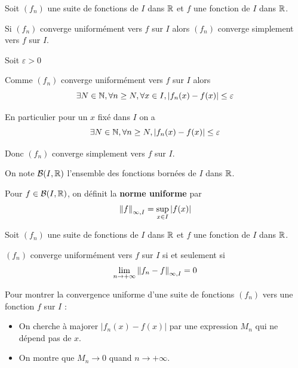 \documentclass[a4paper, 12pt]{article}
\begin{document}
\begin{proposition}{}{}
    Soit $(f_n)$ une suite de fonctions de $I$ dans $\mathbb{R}$ et $f$ une fonction de $I$ dans $\mathbb{R}$.

    Si $(f_n)$ converge uniformément vers $f$ sur $I$ alors $(f_n)$ converge simplement vers $f$ sur $I$.
\end{proposition}

\begin{demonstration}
    Soit $\varepsilon > 0$

    Comme $(f_n)$ converge uniformément vers $f$ sur $I$ alors
    $$
    \exists N \in \mathbb{N}, \forall n \geq N, \forall x \in I, |f_n(x) - f(x)| \leq \varepsilon
    $$

    En particulier pour un $x$ fixé dans $I$ on a
    $$
    \exists N \in \mathbb{N}, \forall n \geq N, |f_n(x) - f(x)| \leq \varepsilon
    $$

    Donc $(f_n)$ converge simplement vers $f$ sur $I$.
\end{demonstration}

\begin{definition}
    On note $\mathcal{B}(I, \mathbb{R})$ l'ensemble des fonctions bornées de $I$ dans $\mathbb{R}$.
    
    Pour $f \in \mathcal{B}(I, \mathbb{R})$, on définit la \textbf{norme uniforme} par
    $$
    \left\lVert f\right\rVert_{\infty, I} = \sup_{x \in I} |f(x)|
    $$
\end{definition}

\begin{definition}
    Soit $(f_n)$ une suite de fonctions de $I$ dans $\mathbb{R}$ et $f$ une fonction de $I$ dans $\mathbb{R}$.

    $(f_n)$ converge uniformément vers $f$ sur $I$ si et seulement si
    $$
    \lim\limits_{n \to +\infty} \left\lVert f_n - f\right\rVert_{\infty, I} = 0
    $$
\end{definition}

\vspace{0.5cm}

\begin{methode}
    Pour montrer la convergence uniforme d'une suite de fonctions $(f_n)$ vers une fonction $f$ sur $I$ :
    \begin{itemize}[label=--]
        \item On cherche à majorer $|f_n(x) - f(x)|$ par une expression $M_n$ qui ne dépend pas de $x$.
        \item On montre que $M_n \to 0$ quand $n \to +\infty$.
    \end{itemize}
\end{methode}
\end{document}
